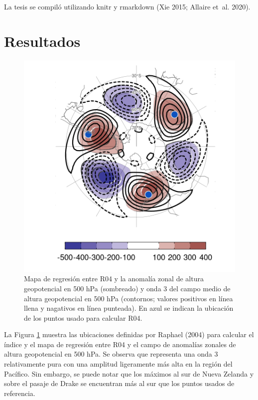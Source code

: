 \documentclass[12pt,oneside,a4paper]{reedthesis}
\begin{document}
La tesis se compiló utilizando knitr y rmarkdown (Xie 2015; Allaire et~al. 2020).

\hypertarget{resultados}{%
\section{Resultados}\label{resultados}}

\begin{figure}

{\centering \includegraphics{figures/15-onda3/raphael-regr-1} 

}

\caption{Mapa de regresión entre R04 y la anomalía zonal de altura geopotencial en 500 hPa (sombreado) y onda 3 del campo medio de altura geopotencial en 500 hPa (contornos; valores positivos en línea llena y nagativos en línea punteada). En azul se indican la ubicación de los puntos usado para calcular R04.}\label{fig:raphael-regr}
\end{figure}



La Figura \ref{fig:raphael-regr} muestra las ubicaciones definidas por Raphael (2004) para calcular el índice y el mapa de regresión entre R04 y el campo de anomalías zonales de altura geopotencial en 500 hPa.
Se observa que representa una onda 3 relativamente pura con una amplitud ligeramente más alta en la región del Pacífico.
Sin embargo, se puede notar que los máximos al sur de Nueva Zelanda y sobre el pasaje de Drake se encuentran más al sur que los puntos usados de referencia.
\end{document}
